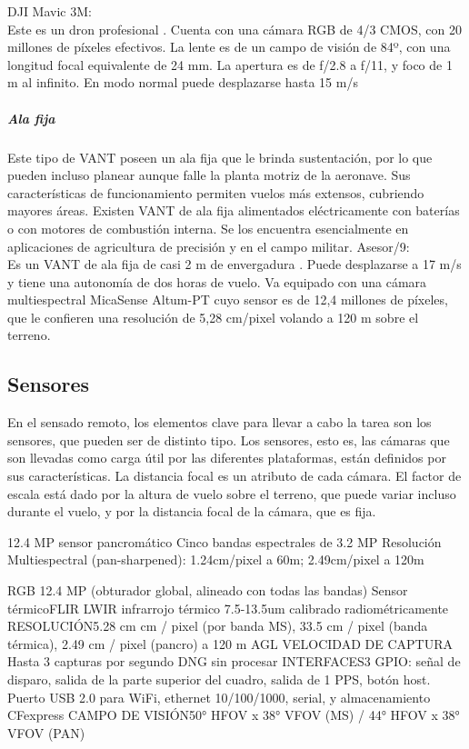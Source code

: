 DJI Mavic 3M:\\
Este es un dron profesional \cite{noauthor_dji_nodate}. Cuenta con una cámara RGB de 4/3 CMOS, con 20 millones de píxeles efectivos. La lente es de un campo de visión de 84º, con una longitud focal equivalente de 24 mm. La apertura es de f/2.8 a f/11, y foco de 1 m al infinito. En modo normal puede desplazarse hasta 15 m/s
\subparagraph{Ala fija}
Este tipo de VANT poseen un ala fija que le brinda sustentación, por lo que pueden incluso planear aunque falle la planta motriz de la aeronave. Sus características de funcionamiento permiten vuelos más extensos, cubriendo mayores áreas. Existen VANT de ala fija alimentados eléctricamente con baterías o con motores de combustión interna. Se los encuentra esencialmente en aplicaciones de agricultura de precisión y en el campo militar. 
Asesor/9:\\
Es un VANT de ala fija de casi 2 m de envergadura \cite{noauthor_drone_nodate}. Puede desplazarse a 17 m/s y tiene una autonomía de dos horas de vuelo. Va equipado con una cámara multiespectral MicaSense Altum-PT \cite{noauthor_altum-pt_2023} cuyo sensor es de 12,4 millones de píxeles, que le confieren una resolución de 5,28 cm/pixel volando a 120 m sobre el terreno.

\subsection{Sensores}
En el sensado remoto, los elementos clave para llevar a cabo la tarea son los sensores, que pueden ser de distinto tipo.
Los sensores, esto es, las cámaras que son llevadas como carga útil por las diferentes plataformas, están definidos por sus características. La distancia focal es un atributo de cada cámara. El factor de escala está dado por la altura de vuelo sobre el terreno, que puede variar incluso durante el vuelo, y por la distancia focal de la cámara, que es fija. 

12.4 MP sensor pancromático
Cinco bandas espectrales de 3.2 MP
Resolución Multiespectral (pan-sharpened): 1.24cm/pixel a 60m; 2.49cm/pixel a 120m

RGB 12.4 MP (obturador global, alineado con todas las bandas)
Sensor térmicoFLIR LWIR infrarrojo térmico 7.5-13.5um calibrado radiométricamente
RESOLUCIÓN5.28 cm cm / pixel (por banda MS), 33.5 cm / pixel (banda térmica), 2.49 cm / pixel (pancro) a 120 m AGL
VELOCIDAD DE CAPTURA Hasta 3 capturas por segundo DNG sin procesar
INTERFACES3 GPIO: señal de disparo, salida de la parte superior del cuadro, salida de 1 PPS, botón host. Puerto USB 2.0 para WiFi, ethernet 10/100/1000, serial, y almacenamiento CFexpress
CAMPO DE VISIÓN50° HFOV x 38° VFOV (MS) / 44° HFOV x 38° VFOV (PAN)
\color{black}

